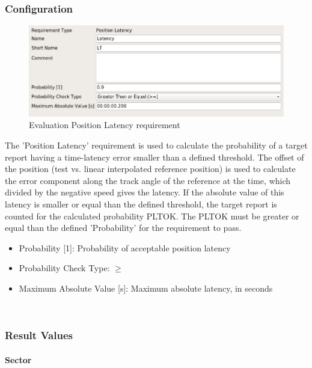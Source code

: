 \subsubsection{Configuration}

\begin{figure}[H]
    \includegraphics[width=14cm,frame]{figures/eval_req_pos_latency.png}
  \caption{Evaluation Position Latency requirement}
\end{figure}

The 'Position Latency' requirement is used to calculate the probability of a target report having a time-latency error smaller than a defined threshold. The offset of the position (test vs. linear interpolated reference position) is used to calculate the error component along the track angle of the reference at the time, which divided by the negative speed gives the latency. If the absolute value of this latency is smaller or equal than the defined threshold, the target report is counted for the calculated probability PLTOK. The PLTOK must be greater or equal than the defined 'Probability' for the requirement to pass. \\

\begin{itemize}  
\item Probability [1]: Probability of acceptable position latency
\item Probability Check Type: $\geq$
\item Maximum Absolute Value [s]: Maximum absolute latency, in seconds
\end{itemize}
\ \\

\subsubsection{Result Values}

\paragraph{Sector}

